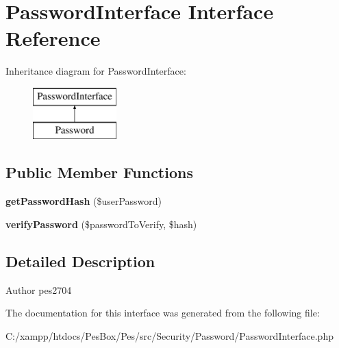 \hypertarget{interface_pes_1_1_security_1_1_password_1_1_password_interface}{}\section{Password\+Interface Interface Reference}
\label{interface_pes_1_1_security_1_1_password_1_1_password_interface}
Inheritance diagram for Password\+Interface\+:\begin{figure}[H]
\begin{center}
\leavevmode
\includegraphics[height=2.000000cm]{interface_pes_1_1_security_1_1_password_1_1_password_interface}
\end{center}
\end{figure}
\subsection*{Public Member Functions}
\begin{DoxyCompactItemize}
\item 
\mbox{\label{interface_pes_1_1_security_1_1_password_1_1_password_interface_ace90dad06accc8133e50dd863df4b91e}} 
{\bfseries get\+Password\+Hash} (\$user\+Password)
\item 
\mbox{\label{interface_pes_1_1_security_1_1_password_1_1_password_interface_a66a5774f5734e6d66c32c500bf9ea335}} 
{\bfseries verify\+Password} (\$password\+To\+Verify, \$hash)
\end{DoxyCompactItemize}


\subsection{Detailed Description}
\begin{DoxyAuthor}{Author}
pes2704 
\end{DoxyAuthor}


The documentation for this interface was generated from the following file\+:\begin{DoxyCompactItemize}
\item 
C\+:/xampp/htdocs/\+Pes\+Box/\+Pes/src/\+Security/\+Password/Password\+Interface.\+php\end{DoxyCompactItemize}

